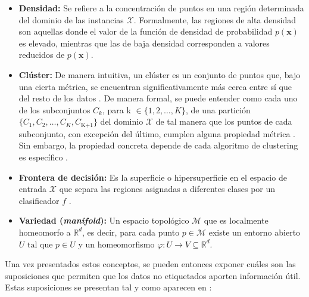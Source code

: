 \begin{itemize}
\item \textbf{Densidad:} Se refiere a la concentración de puntos en una región determinada del dominio de las instancias $\mathcal{X}$. Formalmente, las regiones de alta densidad son aquellas donde el valor de la función de densidad de probabilidad $p(\mathbf{x})$ es elevado, mientras que las de baja densidad corresponden a valores reducidos de $p(\mathbf{x})$.
\item \textbf{Clúster:}  De manera intuitiva, un clúster es un conjunto de puntos que, bajo una cierta métrica, se encuentran significativamente más cerca entre sí que del resto de los datos \cite{bishop2006pattern}. \linebreak De manera formal, se puede entender como cada uno de los subconjuntos $C_k$, para \linebreak k $\in \{1,2,\ldots,K\}$, de una partición $\{C_1, C_2, \ldots, C_K, C_\text{K+1}\}$ del dominio $\mathcal{X}$ de tal manera que los puntos de cada subconjunto, con excepción del último, cumplen alguna propiedad métrica \cite{jain1988algorithms}. Sin embargo, la propiedad concreta depende de cada algoritmo de clustering es específico \cite{estivill2002so}.
\item \textbf{Frontera de decisión:} Es la superficie o hipersuperficie en el espacio de entrada $\mathcal{X}$ que separa las regiones asignadas a diferentes clases por un clasificador $f$ \cite{bishop2006pattern}.
\item \textbf{Variedad (\textit{manifold}):} Un espacio topológico $\mathcal{M}$ que es localmente homeomorfo a $\mathbb{R}^d$, es decir, para cada punto $p \in \mathcal{M}$ existe un entorno abierto $U \text{ tal que } p \in U$ y un homeomorfismo $\varphi: U \to V \subseteq \mathbb{R}^d$. 
\end{itemize}

Una vez presentados estos conceptos, se pueden entonces exponer cuáles son las suposiciones que permiten que los datos no etiquetados aporten información útil. Estas suposiciones se presentan tal y como aparecen en \citet{10.7551/mitpress/9780262033589.001.0001}:

